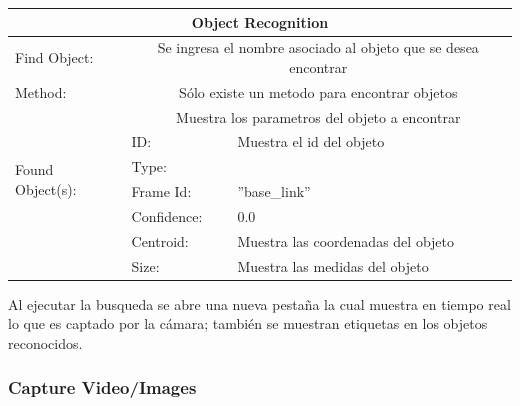 \documentclass[user_manual.tex]{subfiles}
\begin{document}
\begin{table}[H]
\begin{center}
\begin{tabular}{|l|l|l|}%

\hline
\multicolumn{3}{|c|}{Object Recognition}\\ \hline
Find Object:                         &\multicolumn{2}{|c|}{Se ingresa el nombre asociado al objeto que se desea encontrar}                                                         \\ \hline
Method:          					  &\multicolumn{2}{|c|}{Sólo existe un metodo para encontrar objetos}\\ \hline
\multirow{6}{3cm}{Found Object(s):}  &\multicolumn{2}{|c|}{Muestra los parametros del objeto a encontrar}\\ \cline{2-3}
                                     &  ID:         & Muestra el id del objeto  \\ \cline{2-3}
                                     &  Type:       &     \\ \cline{2-3}
                                     &  Frame Id:   & ''base\_link''\\ \cline{2-3} 
                                     &  Confidence: & 0.0   \\ \cline{2-3}
                                     &  Centroid:   & Muestra las coordenadas del objeto   \\ \cline{2-3}
                                     &  Size:       & Muestra las medidas del objeto   \\ \hline
\end{tabular}
\end{center}
\end{table}

Al ejecutar la busqueda se abre una nueva pestaña la cual muestra en tiempo real lo que es captado por la cámara; también se muestran etiquetas en los objetos reconocidos.

\subsubsection{Capture Video/Images}
\end{document}
